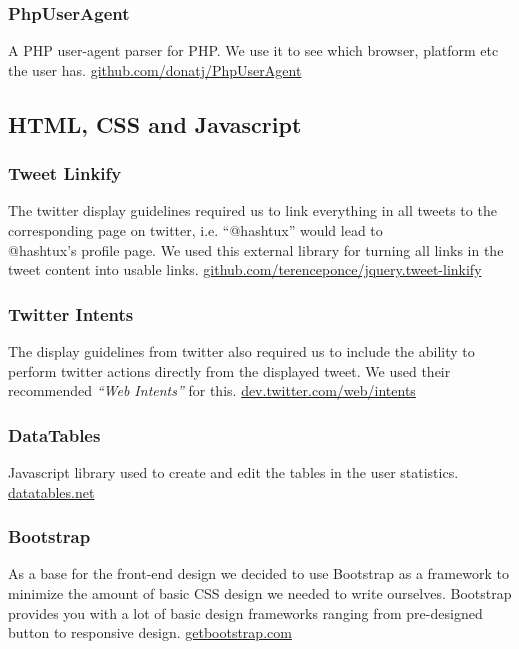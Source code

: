\subsubsection{PhpUserAgent}
A PHP user-agent parser for PHP. We use it to see which browser, platform etc
the user has. \newline
\href{https://github.com/donatj/PhpUserAgent}{github.com/donatj/PhpUserAgent}

\subsection{HTML, CSS and Javascript}
\subsubsection{Tweet Linkify}
The twitter display guidelines required us to link everything in all tweets to
the corresponding page on twitter, i.e. ``@hashtux'' would lead to\\  @hashtux's
profile page. We used this external library for turning all links in the tweet
content into usable links. \newline
\href{https://github.com/terenceponce/jquery.tweet-linkify}
   {github.com/terenceponce/jquery.tweet-linkify}
\subsubsection{Twitter Intents}
The display guidelines from twitter also required us to include the ability to
perform twitter actions directly from the displayed tweet. We used their
recommended \textit{``Web Intents''} for this. \newline
\href{https://dev.twitter.com/web/intents}{dev.twitter.com/web/intents}
\subsubsection{DataTables}
Javascript library used to create and edit the tables in the user statistics.
\newline
\href{https://www.datatables.net/}{datatables.net}
\subsubsection{Bootstrap}
As a base for the front-end design we decided to use Bootstrap as a framework to
minimize the amount of basic CSS design we needed to write ourselves. Bootstrap
provides you with a lot of basic design frameworks ranging from pre-designed
button to responsive design. \newline
\href{http://getbootstrap.com/}{getbootstrap.com}